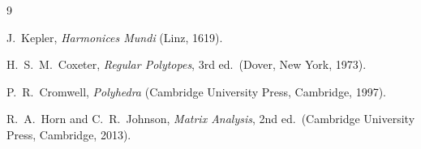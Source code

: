 \documentclass[twocolumn]{iopjournal}
\theoremstyle{definition}
\begin{document}

\begin{thebibliography}{9}

J.~Kepler,
\textit{Harmonices Mundi}
(Linz, 1619).

H.~S.~M.~Coxeter,
\textit{Regular Polytopes},
3rd ed.\ (Dover, New York, 1973).

P.~R.~Cromwell,
\textit{Polyhedra}
(Cambridge University Press, Cambridge, 1997).

R.~A.~Horn and C.~R.~Johnson,
\textit{Matrix Analysis},
2nd ed.\ (Cambridge University Press, Cambridge, 2013).

\end{thebibliography}
\end{document}
